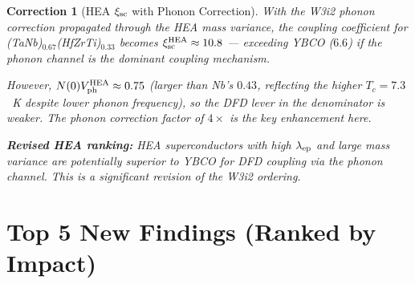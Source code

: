 \documentclass[11pt]{article}
\newtheorem{correction}{Correction}
\begin{document}
\begin{correction}[HEA $\xi_{\rm sc}$ with Phonon Correction]
\label{cor:HEA-phonon}
With the W3i2 phonon correction propagated through the HEA mass variance,
the coupling coefficient for (TaNb)$_{0.67}$(HfZrTi)$_{0.33}$ becomes
$\xi_{\rm sc}^{\rm HEA} \approx 10.8$ --- exceeding YBCO ($6.6$) if the
phonon channel is the dominant coupling mechanism.

However, $N(0)V_{\rm ph}^{\rm HEA} \approx 0.75$ (larger than Nb's $0.43$,
reflecting the higher $T_c = 7.3$~K despite lower phonon frequency), so
the DFD lever in the denominator is weaker. The phonon correction factor
of $4\times$ is the key enhancement here.

\textbf{Revised HEA ranking:} HEA superconductors with high $\lambda_{\rm ep}$
and large mass variance are potentially superior to YBCO for DFD coupling
via the phonon channel. This is a significant revision of the W3i2 ordering.
\end{correction}

\section{Top 5 New Findings (Ranked by Impact)}
\label{sec:top5}
\end{document}
